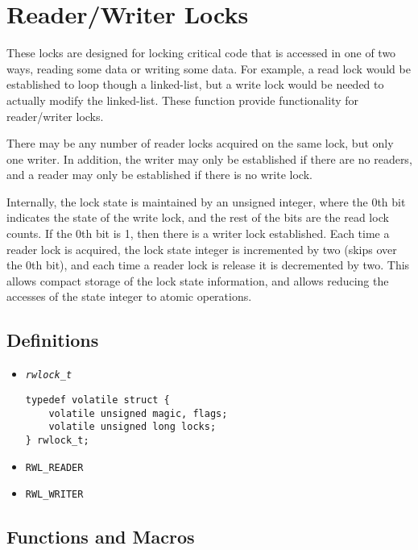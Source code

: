 \section{Reader/Writer Locks}

These locks are designed for locking critical code that is accessed in one of two ways, reading
some data or writing some data. For example, a read lock would be established to loop though a 
linked-list, but a write lock would be needed to actually modify the linked-list. These function provide
functionality for reader/writer locks.

There may be any number of reader locks acquired on the same lock, but only one writer. In addition, 
the writer may only be established if there are no readers, and a reader may only be established if
there is no write lock.

Internally, the lock state is maintained by an unsigned integer, where the 0th bit indicates the 
state of the write lock, and the rest of the bits are the read lock counts. If the 0th bit is 1, then
there is a writer lock established. Each time a reader lock is acquired, the lock state integer is
incremented by two (skips over the 0th bit), and each time a reader lock is release it is decremented
by two. This allows compact storage of the lock state information, and allows reducing the accesses of
the state integer to atomic operations.

\subsection{Definitions}
\begin{itemize}
\item \texttt{\textit{rwlock\_t}} 
\begin{lstlisting}
typedef volatile struct {
	volatile unsigned magic, flags;
	volatile unsigned long locks;
} rwlock_t;
\end{lstlisting}
\item \texttt{RWL\_READER}
\item \texttt{RWL\_WRITER}
\end{itemize}


\subsection{Functions and Macros}

